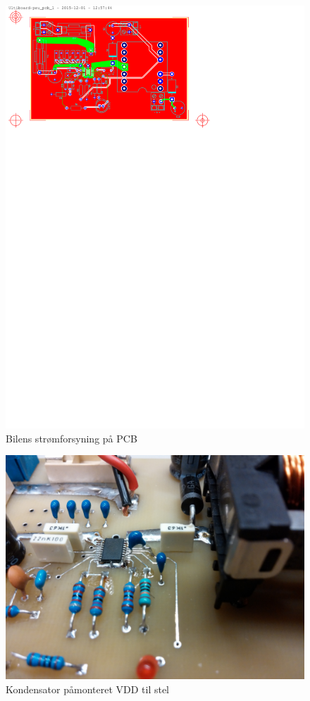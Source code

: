 \clearpage
\begin{landscape}
\begin{figure}
\centering
\includegraphics[height=\textwidth-2cm, clip=true, trim=50 615 234 25]{../fig/diagrammer/bil/psu_pcb_twoside}
\caption{Bilens strømforsyning på PCB}
\label{fig:bil_psu_pcb}
\end{figure}
\end{landscape}

\clearpage

\begin{figure}[h]
\centering
\includegraphics[width=\textwidth- 5cm]{../fig/billeder/impl_psu/psu_vdd_konden}
\caption{Kondensator påmonteret VDD til stel}
\label{fig:bil_psu_Cvdd_img}
\end{figure}

